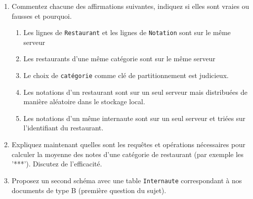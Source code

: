 \documentclass[10pt,a4paper]{article}
\begin{document}
\begin{enumerate}
    \item Commentez chacune des affirmations suivantes, indiquez si elles
sont vraies ou fausses et pourquoi.

\begin{enumerate}
  \item Les lignes de \texttt{Restaurant} et les lignes de \texttt{Notation} 
     sont sur le même serveur
   \item Les restaurants d'une même catégorie sont sur le même serveur
   \item Le choix de \texttt{catégorie} comme clé de partitionnement est judicieux.
   \item Les notations d'un restaurant sont sur un seul serveur mais distribuées
        de manière aléatoire dans le stockage local.
   \item Les notations d'un même internaute sont sur un seul serveur et triées sur l'identifiant du restaurant.  
\end{enumerate}  

  \item Expliquez maintenant quelles sont les requêtes et 
     opérations nécessaires pour calculer la moyenne des notes 
     d'une catégorie de restaurant (par exemple les '***'). 
      Discutez de l'efficacité.     
  \item Proposez un second schéma avec une table \texttt{Internaute}
       correspondant à nos documents de type B
      (première question du sujet).
\end{enumerate}
\end{document}
